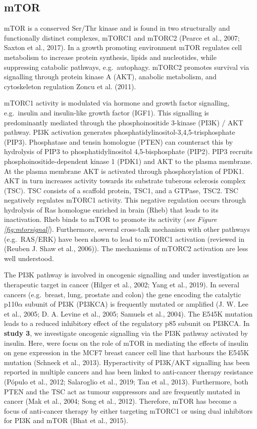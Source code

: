 \documentclass[
  12pt,
  openany]{book}
\begin{document}
\subsection{mTOR} \label{mTOR}

mTOR is a conserved Ser/Thr kinase and is found in two structurally and functionally distinct complexes, mTORC1 and mTORC2 (Pearce et al., 2007; Saxton et al., 2017). In a growth promoting environment mTOR regulates cell metabolism to increase protein synthesis, lipids and nucleotides, while suppressing catabolic pathways, e.g.~autophagy. mTORC2 promotes survival via signalling through protein kinase A (AKT), anabolic metabolism, and cytoskeleton regulation Zoncu et al. (2011).

mTORC1 activity is modulated via hormone and growth factor signalling, e.g.~insulin and insulin-like growth factor (IGF1). This signalling is predominantly mediated through the phosphoinositide 3-kinase (PI3K) / AKT pathway. PI3K activation generates phosphatidylinositol-3,4,5-trisphosphate (PIP3). Phosphatase and tensin homologue (PTEN) can counteract this by hydrolysis of PIP3 to phosphatidylinositol 4,5-bisphosphate (PIP2). PIP3 recruits phosphoinositide-dependent kinase 1 (PDK1) and AKT to the plasma membrane. At the plasma membrane AKT is activated through phosphorylation of PDK1. AKT in turn increases activity towards its substrate tuberous sclerosis complex (TSC). TSC consists of a scaffold protein, TSC1, and a GTPase, TSC2. TSC negatively regulates mTORC1 activity. This negative regulation occurs through hydrolysis of Ras homologue enriched in brain (Rheb) that leads to its inactivation. Rheb binds to mTOR to promote its activity (\emph{see Figure \ref{fig:mtorsignal}}). Furthermore, several cross-talk mechanism with other pathways (e.g.~RAS/ERK) have been shown to lead to mTORC1 activation (reviewed in (Reuben J. Shaw et al., 2006)). The mechanisms of mTORC2 activation are less well understood.

The PI3K pathway is involved in oncogenic signalling and under investigation as therapeutic target in cancer (Hilger et al., 2002; Yang et al., 2019). In several cancers (e.g.~breast, lung, prostate and colon) the gene encoding the catalytic p110\(\alpha\) subunit of PI3K (PI3KCA) is frequently mutated or amplified (J. W. Lee et al., 2005; D. A. Levine et al., 2005; Samuels et al., 2004). The E545K mutation leads to a reduced inhibitory effect of the regulatory p85 subunit on PI3KCA. In \textbf{study 3}, we investigate oncogenic signalling via the PI3K pathway activated by insulin. Here, were focus on the role of mTOR in mediating the effects of insulin on gene expression in the MCF7 breast cancer cell line that harbours the E545K mutation (Schneck et al., 2013). Hyperactivity of PI3K/AKT signalling has been reported in multiple cancers and has been linked to anti-cancer therapy resistance (Pópulo et al., 2012; Salaroglio et al., 2019; Tan et al., 2013). Furthermore, both PTEN and the TSC act as tumour suppressors and are frequently mutated in cancer (Mak et al., 2004; Song et al., 2012). Therefore, mTOR has become a focus of anti-cancer therapy by either targeting mTORC1 or using dual inhibitors for PI3K and mTOR (Bhat et al., 2015).
\clearpage
\end{document}
